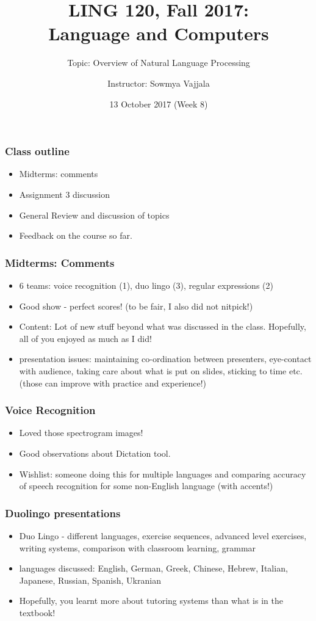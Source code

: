 \documentclass{beamer}
\author[Sowmya Vajjala]{Instructor: Sowmya Vajjala}
\title[LING 120]{LING 120, Fall 2017: \\ Language and Computers}
\subtitle{Topic: Overview of Natural Language Processing}
\date{13 October 2017 (Week 8)}
\institute{Iowa State University, USA}
\begin{document}
\begin{frame}\titlepage
\end{frame}

\begin{frame}%
\frametitle{Class outline}
\begin{itemize}
\item Midterms: comments
\item Assignment 3 discussion
\item General Review and discussion of topics
\item Feedback on the course so far.
\end{itemize}
\end{frame}

\begin{frame}
\frametitle{Midterms: Comments}
\begin{itemize}
\item 6 teams: voice recognition (1), duo lingo (3), regular expressions (2)
\item Good show - perfect scores! (to be fair, I also did not nitpick!)
\item Content: Lot of new stuff beyond what was discussed in the class. Hopefully, all of you enjoyed as much as I did! 
\item presentation issues: maintaining co-ordination between presenters, eye-contact with audience, taking care about what is put on slides, sticking to time etc. (those can improve with practice and experience!)
\end{itemize}
\end{frame}

\begin{frame}
\frametitle{Voice Recognition}
\begin{itemize}
\item Loved those spectrogram images! 
\item Good observations about Dictation tool.
\item Wishlist: someone doing this for multiple languages and comparing accuracy of speech recognition for some non-English language (with accents!)
\end{itemize}
\end{frame}

\begin{frame}
\frametitle{Duolingo presentations}
 \begin{itemize}
 \item Duo Lingo - different languages, exercise sequences, advanced level exercises, writing systems, comparison with classroom learning, grammar
\item languages discussed: English, German, Greek, Chinese, Hebrew, Italian, Japanese, Russian, Spanish, Ukranian
\item Hopefully, you learnt more about tutoring systems than what is in the textbook!
\end{itemize}
\end{frame}
\end{document}
